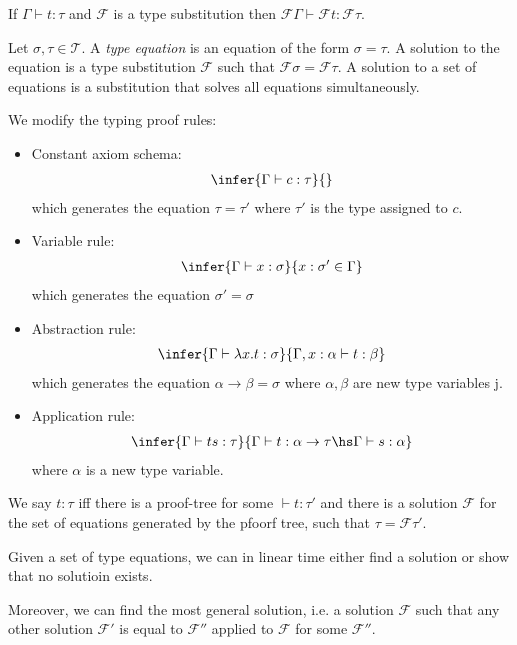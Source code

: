 \documentclass{article}
\begin{document}
\begin{proposition*}[III.20]
	If $\Gamma\vdash t:\tau$ and $\mathcal{F}$ is a type substitution then $\mathcal{F}\Gamma \vdash \mathcal{F}t:\mathcal{F}\tau$.
\end{proposition*}

\begin{definition*}[]
	Let $\sigma,\tau\in\mathcal{T}$. A \emph{type equation} is an equation of the form $\sigma=\tau$. A solution
	to the equation is a type substitution $\mathcal{F}$ such that $\mathcal{F}\sigma=\mathcal{F}\tau$. A 
	solution to a set of equations is a substitution that solves all equations simultaneously.

	We modify the typing proof rules:
	\begin{itemize}
		\item Constant axiom schema: \begin{align*}
			\infer{\Gamma\vdash c:\tau}{}
		\end{align*}
		which generates the equation $\tau=\tau'$ where $\tau'$ is the type assigned to $c$.
		\item Variable rule: \begin{align*}
			\infer{\Gamma\vdash x:\sigma}{x:\sigma'\in\Gamma}
		\end{align*}
		which generates the equation $\sigma'=\sigma$
		\item Abstraction rule: \begin{align*}
			\infer{\Gamma\vdash\lambda x.t:\sigma}{\Gamma,x:\alpha\vdash t:\beta}
		\end{align*}
		which generates the equation $\alpha\to\beta = \sigma$ where $\alpha,\beta$ are new type variables j.
		\item Application rule: \begin{align*}
			\infer{\Gamma\vdash ts:\tau}{\Gamma\vdash t:\alpha\to\tau\hs \Gamma\vdash s:\alpha}
		\end{align*}
		where $\alpha$ is a new type variable.
	\end{itemize}
	We say $t:\tau$ iff there is a proof-tree for some $\vdash t:\tau'$ and there is a solution $\mathcal{F}$
	for the set of equations generated by the pfoorf tree, such that $\tau=\mathcal{F}\tau'$.
\end{definition*}

\begin{proposition*}[III.22]
	Given a set of type equations, we can in linear time either find a solution or show that no solutioin exists.

	Moreover, we can find the most general solution, i.e. a solution $\mathcal{F}$ such that any other 
	solution $\mathcal{F}'$ is equal to $\mathcal{F}''$ applied to $\mathcal{F}$ for some $\mathcal{F}''$.
\end{proposition*}
\end{document}
